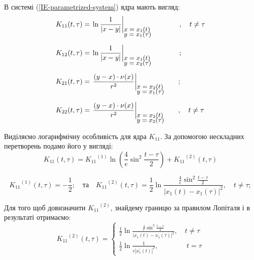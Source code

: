 \documentclass{beamer}
\numberwithin{equation}{section}
\begin{document}
		
	\begin{frame}
		В системі (\ref{IE-parametrized-system}) ядра мають вигляд:
		$$
		\begin{array}{l}
			\displaystyle
			K_{11}(t, \tau) = \left.
			\ln{\frac{1}{\abs{x - y}}}
			\right|_{
				{\small \parbox{20mm}{$ x = x_1(t)$ \\[-4pt] $y = x_1 ({\tau})$}}
			} \quad \quad, \quad t \neq \tau
			\\ [0.8cm]
			
			\displaystyle
			K_{12}(t, \tau) = \left.
			\ln{\frac{1}{\abs{x - y}}}
			\right|_{
				{\small \parbox{20mm}{$ x = x_1(t)$ \\[-4pt] $y = x_2 ({\tau})$}}
			} \quad \quad;
			\\ [0.8cm]
			
			\displaystyle
			K_{21}(t, \tau) = \left.
			\frac{(y - x) \cdot \nu(x)}{r^2}
			\right|_{
				{\small \parbox{20mm}{$ x = x_2(t)$ \\[-4pt] $y = x_1 ({\tau})$}}
			};
			\\ [0.8cm]
			
			\displaystyle
			K_{22}(t, \tau) = \left.
			\frac{(y - x) \cdot \nu(x)}{r^2}
			\right|_{
				{\small \parbox{20mm}{$ x = x_2(t)$ \\[-4pt] $y = x_2 ({\tau})$}}
			} 
			, \quad t \neq \tau
		\end{array}
		$$		
	\end{frame}
	

	\begin{frame}
		Виділяємо логарифмічну особливість для ядра $K_{11}$. За допомогою нескладних перетворень подамо його у вигляді:
		$$
		\displaystyle
		K_{11}(t, \tau) = {K_{11}}^{(1)} \ln \left(\frac{4}{e} \sin ^{2}  \frac{t-\tau}{2}\right)+{K_{11}}^{(2)}(t, \tau)
		$$
		
		$$
		\displaystyle
		{K_{11}}^{(1)}(t, \tau) =-\frac{1}{2};
		\displaystyle
		\quad \text{та} \quad
		\displaystyle
		{K_{11}}^{(2)}(t, \tau) =\frac{1}{2} \ln{\frac{\frac{4}{e} \sin ^{2} \frac{t-\tau}{2}}{\left|x_{1}(t)-x_{1}(\tau)\right|^{2}}}, \quad t \neq \tau;
		$$
		
		Для того щоб довизначити ${K_{11}}^{(2)}$, знайдему границю за правилом Лопіталя і в результаті отримаємо:
		$$
		{K_{11}}^{(2)}(t, \tau) =
		\left\{
		\begin{array}{l}
			\displaystyle
			\frac{1}{2} \ln{\frac{\frac{4}{e} \sin ^{2} \frac{t-\tau}{2}}{\left|x_{1}(t)-x_{1}(\tau)\right|^{2}}}
			,\quad t \neq \tau
			\\ [1cm]
			
			\displaystyle
			\frac{1}{2} \ln \frac{1}{e\left|x_{1}^{\prime}(t)\right|^{2}}
			,\quad  \quad  \quad  \quad   t = \tau
		\end{array}
		\right.
		$$
		
	\end{frame}
\end{document}
